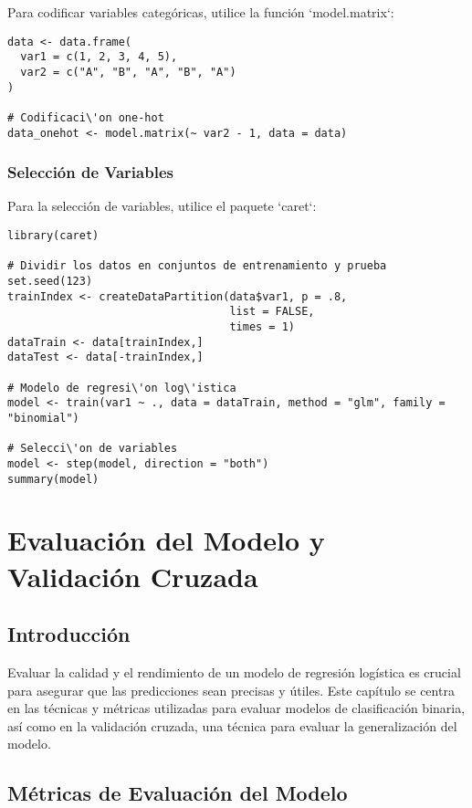 \documentclass[a4paper]{report} %
\begin{document}
Para codificar variables categ\'oricas, utilice la funci\'on `model.matrix`:
\begin{verbatim}
data <- data.frame(
  var1 = c(1, 2, 3, 4, 5),
  var2 = c("A", "B", "A", "B", "A")
)

# Codificaci\'on one-hot
data_onehot <- model.matrix(~ var2 - 1, data = data)
\end{verbatim}

\subsection{Selecci\'on de Variables}

Para la selecci\'on de variables, utilice el paquete `caret`:
\begin{verbatim}
library(caret)

# Dividir los datos en conjuntos de entrenamiento y prueba
set.seed(123)
trainIndex <- createDataPartition(data$var1, p = .8, 
                                  list = FALSE, 
                                  times = 1)
dataTrain <- data[trainIndex,]
dataTest <- data[-trainIndex,]

# Modelo de regresi\'on log\'istica
model <- train(var1 ~ ., data = dataTrain, method = "glm", family = "binomial")

# Selecci\'on de variables
model <- step(model, direction = "both")
summary(model)
\end{verbatim}



\chapter{Evaluación del Modelo y Validación Cruzada}


\section{Introducción}

Evaluar la calidad y el rendimiento de un modelo de regresión logística es crucial para asegurar que las predicciones sean precisas y útiles. Este capítulo se centra en las técnicas y métricas utilizadas para evaluar modelos de clasificación binaria, así como en la validación cruzada, una técnica para evaluar la generalización del modelo.

\section{Métricas de Evaluación del Modelo}
\end{document}
